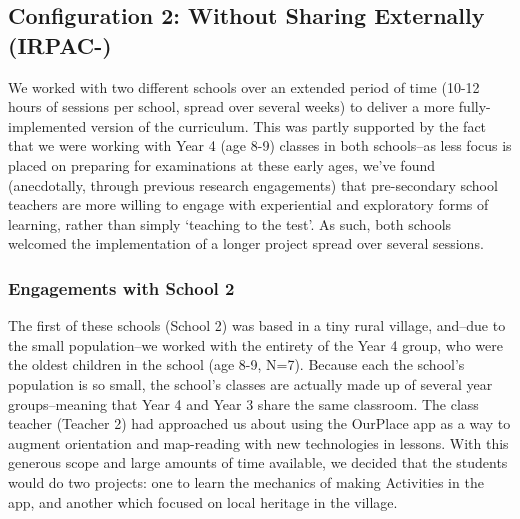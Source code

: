 \documentclass[,hyphens]{sigchi}
\begin{document}
\subsection{Configuration 2: Without Sharing Externally (IRPAC-)}
We worked with two different schools over an extended period of time (10-12 hours of sessions per school, spread over several weeks) to deliver a more fully-implemented version of the curriculum. This was partly supported by the fact that we were working with Year 4 (age 8-9) classes in both schools--as less focus is placed on preparing for examinations at these early ages, we've found (anecdotally, through previous research engagements) that pre-secondary school teachers are more willing to engage with experiential and exploratory forms of learning, rather than simply `teaching to the test'. As such, both schools welcomed the implementation of a longer project spread over several sessions.

\subsubsection{Engagements with School 2}
The first of these schools (School 2) was based in a tiny rural village, and--due to the small population--we worked with the entirety of the Year 4 group, who were the oldest children in the school (age 8-9, N=7). Because each the school's population is so small, the school's classes are actually made up of several year groups--meaning that Year 4 and Year 3 share the same classroom. The class teacher (Teacher 2) had approached us about using the OurPlace app as a way to augment orientation and map-reading with new technologies in lessons. With this generous scope and large amounts of time available, we decided that the students would do two projects: one to learn the mechanics of making Activities in the app, and another which focused on local heritage in the village. 
\end{document}
